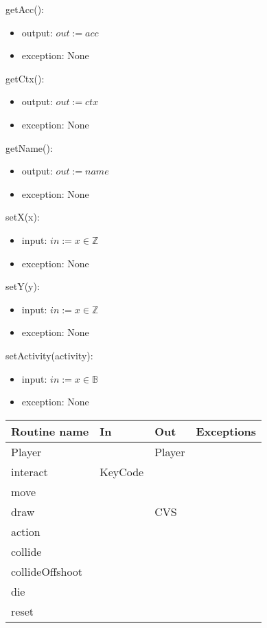 \documentclass[12pt]{article}
\begin{document}
getAcc():
\begin{itemize}
    \item output: $out := acc$
    \item exception: None
\end{itemize}

getCtx():
\begin{itemize}
    \item output: $out := ctx$
    \item exception: None
\end{itemize}

getName():
\begin{itemize}
    \item output: $out := name$
    \item exception: None
\end{itemize}

setX(x):
\begin{itemize}
    \item input: $in := x \in \mathbb{Z}$
    \item exception: None
\end{itemize}

setY(y):
\begin{itemize}
    \item input: $in := x \in \mathbb{Z}$
    \item exception: None
\end{itemize}

setActivity(activity):
\begin{itemize}
    \item input: $in := x \in \mathbb{B}$
    \item exception: None
\end{itemize}

\newpage

\begin{tabular}{| l | l | l | l |}
    \hline
    \textbf{Routine name} & \textbf{In} & \textbf{Out} & \textbf{Exceptions}\\
    \hline
    Player & ~ & Player & ~\\
    \hline
    interact & KeyCode & ~ & ~\\
    \hline
    move & ~ & ~ & ~\\
    \hline
    draw & ~ & CVS & ~\\
    \hline
    action & ~ & ~ & ~\\
    \hline
    collide & ~ & ~ & ~\\
    \hline
    collideOffshoot & ~ & ~ & ~\\
    \hline
    die & ~ & ~ & ~\\
    \hline
    reset & ~ & ~ & ~\\
    \hline
\end{tabular}
\end{document}
